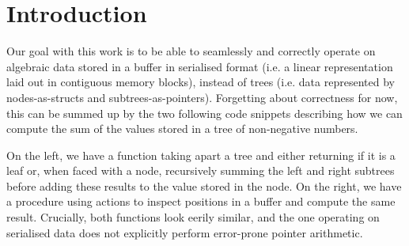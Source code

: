 \section{Introduction}

Our goal with this work is to be able to seamlessly and correctly
operate on algebraic data stored in a buffer in serialised format
(i.e. a linear representation laid out in contiguous memory blocks),
instead of trees
(i.e. data represented by nodes-as-structs and subtrees-as-pointers).
%
Forgetting about correctness for now, this can be summed up by the
two following code snippets describing how we can compute the sum
of the values stored in a tree of non-negative numbers.

\noindent
\begin{minipage}{.4\textwidth}
\end{minipage}
\hfill\begin{minipage}{.55\textwidth}
\end{minipage}

On the left, we have a function taking apart a tree and either returning
 if it is a leaf or, when faced with a node, recursively
summing the left and right subtrees before adding these results to the value
stored in the node.
%
On the right, we have a procedure using  actions to inspect
positions in a buffer and compute the same result.
%
Crucially, both functions look eerily similar, and the one operating on
serialised data does not explicitly perform error-prone pointer arithmetic.
